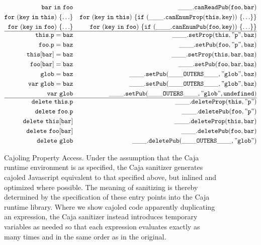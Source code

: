 \documentclass[letterpaper,twocolumn,10pt]{article}
\newcommand{\code}[1]{{\tt {#1}}}              %
\begin{document}
\begin{figure}
\begin{eqnarray}
  \code{bar\ in\ foo}       & \label{in:public}         & \code{\_\_\_.canReadPub(foo,bar)} \\
  \code{for\ (key\ in\ this)\ \{\ldots\}} & \label{for:internal}
                                 & \code{for\ (key\ in\ this)\ \{if\ (\_\_\_.canEnumProp(this,key))\ \{\ldots\}\}}\\
  \code{for\ (key\ in\ foo)\ \{\ldots\}}  & \label{for:public}
                                 & \code{for\ (key\ in\ foo)\ \{if\ (\_\_\_.canEnumPub(foo,key))\ \{\ldots\}\}} \\
  \hline
  \code{this.p = baz}       & \label{set:internal}      & \code{\_\_\_.setProp(this,"p",baz)} \\
  \code{foo.p = baz}        & \label{set:public}        & \code{\_\_\_.setPub(foo,"p",baz)} \\
  \code{this[bar] = baz}    & \label{set:index-internal} & \code{\_\_\_.setProp(this,bar,baz)} \\
  \code{foo[bar] = baz}     & \label{set:index-public}  & \code{\_\_\_.setPub(foo,bar,baz)} \\
  \code{glob = baz}         & \label{set:global}        & \code{\_\_\_.setPub(\_\_\_OUTERS\_\_\_,"glob",baz)} \\
  \code{var\ glob = baz}    & \label{set:global-init}   & \code{\_\_\_.setPub(\_\_\_OUTERS\_\_\_,"glob",baz)} \\
  \code{var\ glob}          & \label{set:global-decl}   & \code{\_\_\_.setPub(\_\_\_OUTERS\_\_\_,"glob",undefined)}\\
  \hline
  \code{delete\ this.p}     & \label{delete-internal}   & \code{\_\_\_.deleteProp(this,"p")} \\
  \code{delete\ foo.p}      & \label{delete:public}     & \code{\_\_\_.deletePub(foo,"p")} \\
  \code{delete\ this[bar]}  & \label{delete:index-internal} & \code{\_\_\_.deleteProp(this,bar)} \\
 \code{delete\ foo[bar]}    & \label{delete:index-public}   & \code{\_\_\_.deletePub(foo,bar)} \\
  \code{delete\ glob}       & \label{delete:global}   & \code{\_\_\_.deletePub(\_\_\_OUTERS\_\_\_,"glob")}
\end{eqnarray}

\caption[Cajoling Property Access]{Cajoling Property Access. Under the 
assumption that the Caja runtime environment is as specified, the Caja 
sanitizer generates cajoled Javascript equivalent to that specified above, 
but inlined and optimized where possible. The meaning of sanitizing is 
thereby determined by the specification of these entry points into the Caja 
runtime library. Where we show cajoled code apparently duplicating an 
expression, the Caja sanitizer instead introduces temporary variables as 
needed so that each expression evaluates exactly as many times and in the 
same order as in the original.}
\label{tab:prop-xlate}
\end{figure}
\end{document}
